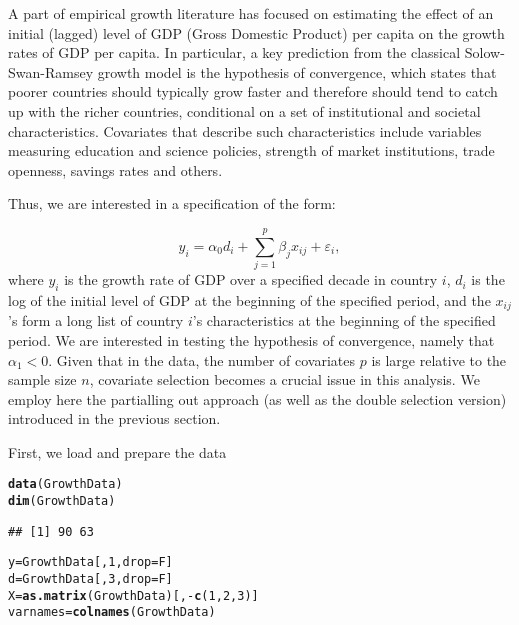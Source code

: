 \documentclass{amsart}\usepackage[]{graphicx}\usepackage[]{color}
\makeatletter
\newcommand{\hlnum}[1]{\textcolor[rgb]{0.686,0.059,0.569}{#1}}%
\newcommand{\hlopt}[1]{\textcolor[rgb]{0,0,0}{#1}}%
\newcommand{\hlstd}[1]{\textcolor[rgb]{0.345,0.345,0.345}{#1}}%
\newcommand{\hlkwb}[1]{\textcolor[rgb]{0.69,0.353,0.396}{#1}}%
\newcommand{\hlkwc}[1]{\textcolor[rgb]{0.333,0.667,0.333}{#1}}%
\newcommand{\hlkwd}[1]{\textcolor[rgb]{0.737,0.353,0.396}{\textbf{#1}}}%
\newenvironment{kframe}{%
 \def\at@end@of@kframe{}%
 \ifinner\ifhmode%
  \def\at@end@of@kframe{\end{minipage}}%
  \begin{minipage}{\columnwidth}%
 \fi\fi%
 \def\FrameCommand##1{\hskip\@totalleftmargin \hskip-\fboxsep
 \colorbox{shadecolor}{##1}\hskip-\fboxsep
     \hskip-\linewidth \hskip-\@totalleftmargin \hskip\columnwidth}%
 \MakeFramed {\advance\hsize-\width
   \@totalleftmargin\z@ \linewidth\hsize
   \@setminipage}}%
 {\par\unskip\endMakeFramed%
 \at@end@of@kframe}
\newenvironment{knitrout}{}{} %
\makeatother
\begin{document}
A part of empirical growth literature has focused on estimating the effect of an initial (lagged) level of GDP (Gross Domestic Product) per capita on the growth rates of GDP per capita. In particular, a key prediction from the classical Solow-Swan-Ramsey growth model is the hypothesis of convergence, which states that poorer countries should typically grow faster and therefore should tend to catch up with the richer countries, conditional on a set of institutional and societal characteristics. Covariates that describe such characteristics  include variables measuring education and science policies, strength of market institutions, trade openness, savings rates and others.


Thus, we are interested in a specification of the form:

\[
\label{GrowthEq}
y_i = \alpha_0 d_i+ \sum_{j=1}^p \beta_j x_{ij} + \varepsilon_i, \]
where $y_i$ is the growth rate of GDP over a specified decade in country $i$, $d_i$ is the log of the
initial level of GDP at the beginning of the specified period, and the $x_{ij}$'s form a
long list of country $i$'s characteristics at the beginning of the specified period. We
are interested in testing the hypothesis of convergence, namely that $\alpha_1 < 0$.
Given that in the \citet{BarroLee1994} data, the number
of covariates $p$ is large relative to the sample size $n$,
covariate selection becomes a crucial issue in this analysis.
We employ here the partialling out approach (as well as the double selection version) introduced in the previous section.


First, we load and prepare the data

\begin{knitrout}
\color{fgcolor}\begin{kframe}
\begin{alltt}
\hlkwd{data}\hlstd{(GrowthData)}
\hlkwd{dim}\hlstd{(GrowthData)}
\end{alltt}
\begin{verbatim}
## [1] 90 63
\end{verbatim}
\begin{alltt}
\hlstd{y} \hlkwb{=} \hlstd{GrowthData[,}\hlnum{1}\hlstd{,}\hlkwc{drop}\hlstd{=F]}
\hlstd{d} \hlkwb{=} \hlstd{GrowthData[,}\hlnum{3}\hlstd{,} \hlkwc{drop}\hlstd{=F]}
\hlstd{X} \hlkwb{=} \hlkwd{as.matrix}\hlstd{(GrowthData)[,}\hlopt{-}\hlkwd{c}\hlstd{(}\hlnum{1}\hlstd{,}\hlnum{2}\hlstd{,}\hlnum{3}\hlstd{)]}
\hlstd{varnames} \hlkwb{=} \hlkwd{colnames}\hlstd{(GrowthData)}
\end{alltt}
\end{kframe}
\end{knitrout}
\end{document}
